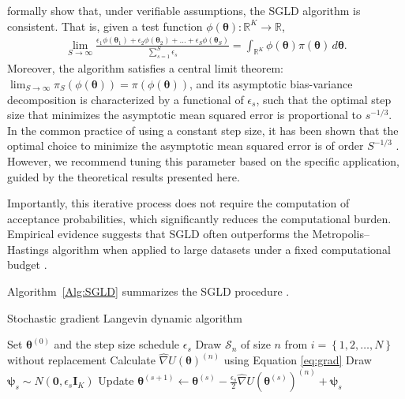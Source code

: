 \cite{teh2016consistency} formally show that, under verifiable assumptions, the SGLD algorithm is consistent. That is, given a test function $\phi(\boldsymbol{\theta}): \mathbb{R}^K \rightarrow \mathbb{R}$,
\begin{align*}
	\lim_{S \rightarrow \infty} \frac{\epsilon_1 \phi(\boldsymbol{\theta}_1) + \epsilon_2 \phi(\boldsymbol{\theta}_2) + \dots + \epsilon_S \phi(\boldsymbol{\theta}_S)}{\sum_{s=1}^S \epsilon_s} = \int_{\mathbb{R}^K} \phi(\boldsymbol{\theta}) \pi(\boldsymbol{\theta}) \, d\boldsymbol{\theta}.
\end{align*}
Moreover, the algorithm satisfies a central limit theorem: $\lim_{S \rightarrow \infty} \pi_S(\phi(\boldsymbol{\theta})) = \pi(\phi(\boldsymbol{\theta}))$, and its asymptotic bias-variance decomposition is characterized by a functional of $\epsilon_s$, such that the optimal step size that minimizes the asymptotic mean squared error is proportional to $s^{-1/3}$. In the common practice of using a constant step size, it has been shown that the optimal choice to minimize the asymptotic mean squared error is of order \( S^{-1/3} \) \cite{vollmer2016exploration}. However, we recommend tuning this parameter based on the specific application, guided by the theoretical results presented here. 

Importantly, this iterative process does not require the computation of acceptance probabilities, which significantly reduces the computational burden. Empirical evidence suggests that SGLD often outperforms the Metropolis–Hastings algorithm when applied to large datasets under a fixed computational budget \cite{li2016scalable}.

Algorithm~\ref{Alg:SGLD} summarizes the SGLD procedure \cite{nemeth2021stochastic}. 

\begin{algorithm}[h!]
	\caption{Stochastic gradient Langevin dynamic algorithm}\label{Alg:SGLD}
	\begin{algorithmic}[1]
		\State Set $\bm{\theta}^{(0)}$ and the step size schedule $\epsilon_s$  		 			
		\State Draw $\mathcal{S}_n$ of size $n$ from $i=\left\{1,2,\dots,N\right\}$ without replacement
		\State Calculate $\hat{\nabla} U(\boldsymbol{\theta})^{(n)}$ using Equation \ref{eq:grad}  
		\State Draw $\boldsymbol{\psi}_s\sim N(\mathbf{0},\epsilon_s\mathbf{I}_K)$
		\State Update $\boldsymbol{\theta}^{(s+1)}\leftarrow \boldsymbol{\theta}^{(s)} -\frac{\epsilon_s}{2}\hat{\nabla} U(\boldsymbol{\theta}^{(s)})^{(n)}+\boldsymbol{\psi}_s$
		\EndFor 
	\end{algorithmic} 
\end{algorithm}
 
